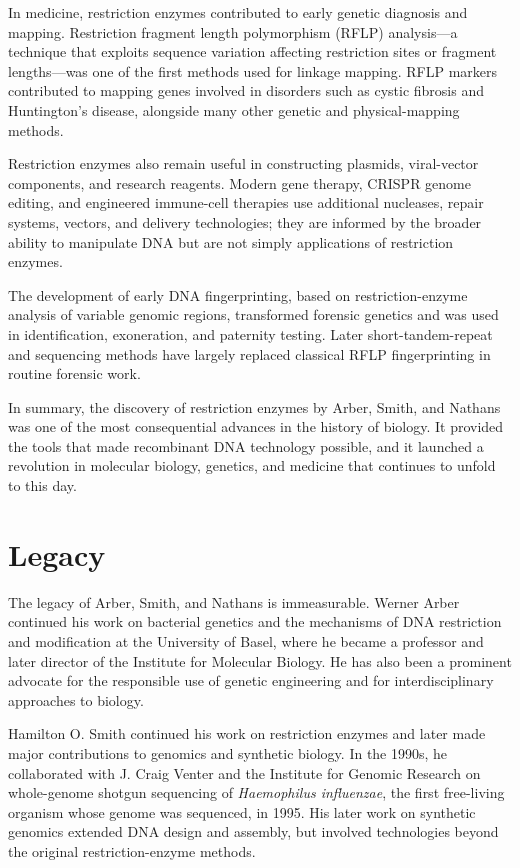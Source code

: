 In medicine, restriction enzymes contributed to early genetic diagnosis and mapping. Restriction fragment length polymorphism (RFLP) analysis---a technique that exploits sequence variation affecting restriction sites or fragment lengths---was one of the first methods used for linkage mapping. RFLP markers contributed to mapping genes involved in disorders such as cystic fibrosis and Huntington's disease, alongside many other genetic and physical-mapping methods.

Restriction enzymes also remain useful in constructing plasmids, viral-vector components, and research reagents. Modern gene therapy, CRISPR genome editing, and engineered immune-cell therapies use additional nucleases, repair systems, vectors, and delivery technologies; they are informed by the broader ability to manipulate DNA but are not simply applications of restriction enzymes.

The development of early DNA fingerprinting, based on restriction-enzyme analysis of variable genomic regions, transformed forensic genetics and was used in identification, exoneration, and paternity testing. Later short-tandem-repeat and sequencing methods have largely replaced classical RFLP fingerprinting in routine forensic work.

In summary, the discovery of restriction enzymes by Arber, Smith, and Nathans was one of the most consequential advances in the history of biology. It provided the tools that made recombinant DNA technology possible, and it launched a revolution in molecular biology, genetics, and medicine that continues to unfold to this day.

\section{Legacy}

The legacy of Arber, Smith, and Nathans is immeasurable. Werner Arber continued his work on bacterial genetics and the mechanisms of DNA restriction and modification at the University of Basel, where he became a professor and later director of the Institute for Molecular Biology. He has also been a prominent advocate for the responsible use of genetic engineering and for interdisciplinary approaches to biology.

Hamilton O. Smith continued his work on restriction enzymes and later made major contributions to genomics and synthetic biology. In the 1990s, he collaborated with J. Craig Venter and the Institute for Genomic Research on whole-genome shotgun sequencing of \emph{Haemophilus influenzae}, the first free-living organism whose genome was sequenced, in 1995. His later work on synthetic genomics extended DNA design and assembly, but involved technologies beyond the original restriction-enzyme methods.

